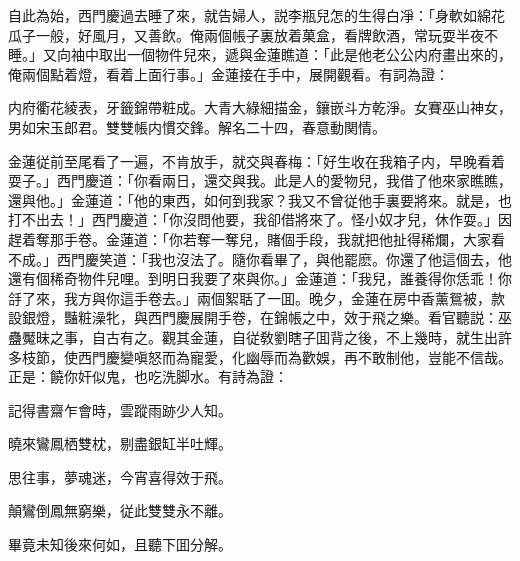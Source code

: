自此為始，西門慶過去睡了來，就告婦人，説李瓶兒怎的生得白凈：「身軟如綿花瓜子一般，好風月，又善飲。俺兩個帳子裏放着菓盒，看牌飲酒，常玩耍半夜不睡。」又向袖中取出一個物件兒來，遞與金蓮瞧道：「此是他老公公内府畫出來的，俺兩個點着燈，看着上面行事。」金蓮接在手中，展開觀看。有詞為證：

\begin{myquote}
内府衢花綾表，牙籤錦帶粧成。大青大綠細描金，鑲嵌斗方乾淨。女賽巫山神女，男如宋玉郎君。雙雙帳内慣交鋒。解名二十四，春意動関情。
\end{myquote}

金蓮従前至尾看了一遍，不肯放手，就交與春梅：「好生收在我箱子内，早晚看着耍子。」西門慶道：「你看兩日，還交與我。此是人的愛物兒，我借了他來家瞧瞧，還與他。」金蓮道：「他的東西，如何到我家？我又不曾従他手裏要將來。就是，也打不出去！」西門慶道：「你沒問他要，我卻借將來了。怪小奴才兒，休作耍。」因趕着奪那手卷。金蓮道：「你若奪一奪兒，賭個手段，我就把他扯得稀爛，大家看不成。」西門慶笑道：「我也沒法了。隨你看畢了，與他罷麽。你還了他這個去，他還有個稀奇物件兒哩。到明日我要了來與你。」金蓮道：「我兒，誰養得你恁乖！你㧱了來，我方與你這手卷去。」兩個絮聒了一囬。晚夕，金蓮在房中香薰鴛被，款設銀燈，豔粧澡牝，與西門慶展開手卷，在錦帳之中，效于飛之樂。看官聽説：巫蠱魘昧之事，自古有之。觀其金蓮，自従敎劉瞎子囬背之後，不上幾時，就生出許多枝節，使西門慶變嗔怒而為寵愛，化幽辱而為歡娛，再不敢制他，豈能不信哉。正是：饒你奸似鬼，也吃洗脚水。有詩為證：

\begin{myquote}
記得書齋乍會時，雲蹤雨跡少人知。

曉來鸞鳳栖雙枕，剔盡銀缸半吐輝。

思往事，夢魂迷，今宵喜得效于飛。

顛鸞倒鳳無窮樂，従此雙雙永不離。
\end{myquote}

畢竟未知後來何如，且聽下囬分解。

